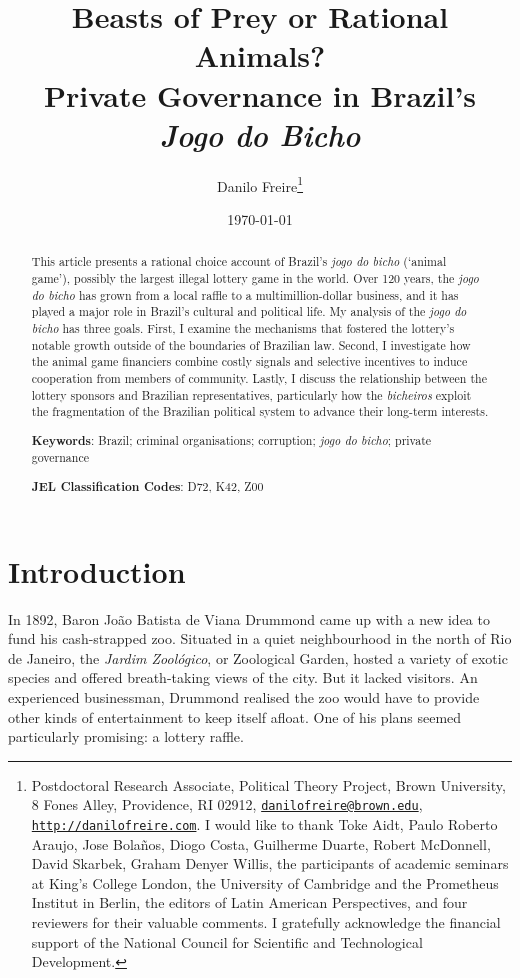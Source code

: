 \documentclass[a4paper,12pt]{article}
\title{\textbf{Beasts of Prey or Rational Animals?\\ Private Governance in Brazil's \textit{Jogo do Bicho}}}
\author{Danilo Freire\thanks{Postdoctoral Research Associate, Political Theory Project, Brown University, 8 Fones Alley, Providence, RI 02912, \href{mailto:danilofreire@brown.edu}{\texttt{danilofreire@brown.edu}}, \href{http://danilofreire.com}{\texttt{http://danilofreire.com}}. I would like to thank Toke Aidt, Paulo Roberto Araujo, Jose Bolaños, Diogo Costa, Guilherme Duarte, Robert McDonnell, David Skarbek, Graham Denyer Willis, the participants of academic seminars at King's College London, the University of Cambridge and the Prometheus Institut in Berlin, the editors of Latin American Perspectives, and four reviewers for their valuable comments. I gratefully acknowledge the financial support of the National Council for Scientific and Technological Development.}
}
\date{\today}
\begin{document}
\maketitle
\begin{abstract}
\noindent
This article presents a rational choice account of Brazil's \textit{jogo do bicho} (`animal game'), possibly the largest illegal lottery game in the world. Over 120 years, the \textit{jogo do bicho} has grown from a local raffle to a multimillion-dollar business, and it has played a major role in Brazil's cultural and political life. My analysis of the \textit{jogo do bicho} has three goals. First, I examine the mechanisms that fostered the lottery's notable growth outside of the boundaries of Brazilian law. Second, I investigate how the animal game financiers combine costly signals and selective incentives to induce cooperation from members of community. Lastly, I discuss the relationship between the lottery sponsors and Brazilian representatives, particularly how the \textit{bicheiros} exploit the fragmentation of the Brazilian political system to advance their long-term interests. 

 \vspace{.5cm}
 \noindent
 \textbf{Keywords}: Brazil; criminal organisations; corruption; \textit{jogo do bicho}; private governance
  
 \vspace{.25cm}
 \noindent
 \textbf{JEL Classification Codes}: D72, K42, Z00
\end{abstract}

\newpage

\section{Introduction}%
\label{sec:intro}

In 1892, Baron João Batista de Viana Drummond came up with a new idea to fund his cash-strapped zoo. Situated in a quiet neighbourhood in the north of Rio de Janeiro, the \textit{Jardim Zoológico}, or Zoological Garden, hosted a variety of exotic species and offered breath-taking views of the city. But it lacked visitors. An experienced businessman, Drummond realised the zoo would have to provide other kinds of entertainment to keep itself afloat. One of his plans seemed particularly promising: a lottery raffle.
\end{document}
